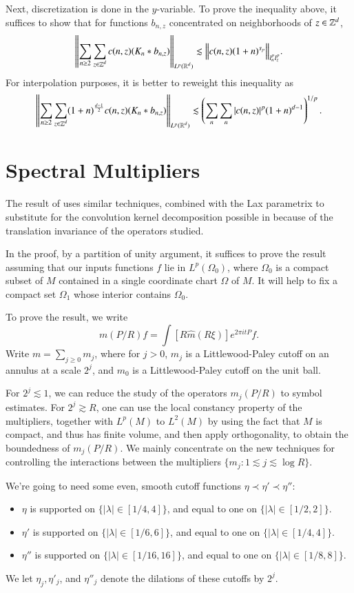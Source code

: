 Next, discretization is done in the $y$-variable. To prove the inequality above, it suffices to show that for functions $b_{n,z}$ concentrated on neighborhoods of $z \in \operatorname{\mathbb{Z}}^d$,
%
\[ \left\| \sum_{n \geq 2} \sum_{z \in \operatorname{\mathbb{Z}}^d} c(n,z) (K_n * b_{n,z}) \right\|_{L^p(\operatorname{\mathbb{R}}^d)} \lesssim \Big\| c(n,z) (1 + n)^{s_p} \Big\|_{l^p_n l^p_z}. \]
%
For interpolation purposes, it is better to reweight this inequality as
%
\[ \left\| \sum_{n \geq 2} \sum_{z \in \operatorname{\mathbb{Z}}^d} (1 + n)^{\frac{d-1}{2}} c(n,z) (K_n * b_{n,z}) \right\|_{L^p(\operatorname{\mathbb{R}}^d)} \lesssim \left( \sum_n \sum_n |c(n,z)|^p (1 + n)^{d-1} \right)^{1/p}. \]

\section{Spectral Multipliers}

The result of \cite{KimSpectral} uses similar techniques, combined with the Lax parametrix to substitute for the convolution kernel decomposition possible in \cite{KimQuasiradial} because of the translation invariance of the operators studied.

In the proof, by a partition of unity argument, it suffices to prove the result assuming that our inputs functions $f$ lie in $L^p(\Omega_0)$, where $\Omega_0$ is a compact subset of $M$ contained in a single coordinate chart $\Omega$ of $M$. It will help to fix a compact set $\Omega_1$ whose interior contains $\Omega_0$.

To prove the result, we write
%
\[ m(P / R) f = \int [R \widehat{m}(R\xi) ] e^{2 \pi i t P} f. \]
%
Write $m = \sum_{j \geq 0} m_j$, where for $j > 0$, $m_j$ is a Littlewood-Paley cutoff on an annulus at a scale $2^j$, and $m_0$ is a Littlewood-Paley cutoff on the unit ball.

For $2^j \lesssim 1$, we can reduce the study of the operators $m_j(P/R)$ to symbol estimates. For $2^j \gtrsim R$, one can use the local constancy property of the multipliers, together with $L^p(M)$ to $L^2(M)$ by using the fact that $M$ is compact, and thus has finite volume, and then apply orthogonality, to obtain the boundedness of $m_j(P/R)$. We mainly concentrate on the new techniques for controlling the interactions between the multipliers $\{ m_j : 1 \lesssim j \lesssim \log R \}$.

We're going to need some even, smooth cutoff functions $\eta \prec \eta' \prec \eta''$:
%
\begin{itemize}
    \item $\eta$ is supported on $\{ |\lambda| \in [1/4,4] \}$, and equal to one on $\{ |\lambda| \in [1/2,2] \}$.

    \item $\eta'$ is supported on $\{ |\lambda| \in [1/6,6] \}$, and equal to one on $\{ |\lambda| \in [1/4,4] \}$.

    \item $\eta''$ is supported on $\{ |\lambda| \in [1/16,16] \}$, and equal to one on $\{ |\lambda| \in [1/8,8] \}$.
\end{itemize}
%
We let $\eta_j, \eta'_j$, and $\eta''_j$ denote the dilations of these cutoffs by $2^j$.


